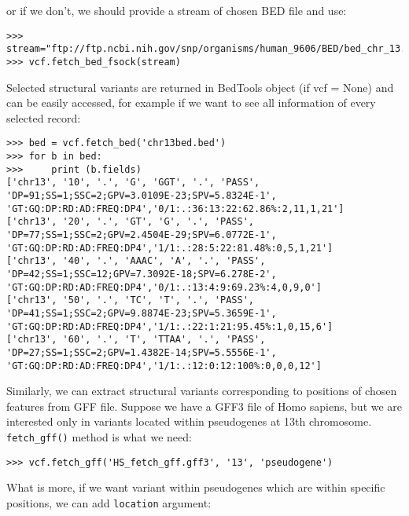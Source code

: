 \noindent or if we don't, we should provide a stream of chosen BED file and use:


\begin{verbatim}
>>> stream="ftp://ftp.ncbi.nih.gov/snp/organisms/human_9606/BED/bed_chr_13.bed.gz"
>>> vcf.fetch_bed_fsock(stream)

\end{verbatim}


\noindent Selected structural variants are returned in BedTools object (if vcf = None) and can be easily accessed, for example
if we want to see all information of every selected record:


\begin{verbatim}
>>> bed = vcf.fetch_bed('chr13bed.bed')
>>> for b in bed:
>>>     print (b.fields)
['chr13', '10', '.', 'G', 'GGT', '.', 'PASS', 'DP=91;SS=1;SSC=2;GPV=3.0109E-23;SPV=5.8324E-1',
'GT:GQ:DP:RD:AD:FREQ:DP4','0/1:.:36:13:22:62.86%:2,11,1,21']
['chr13', '20', '.', 'GT', 'G', '.', 'PASS', 'DP=77;SS=1;SSC=2;GPV=2.4504E-29;SPV=6.0772E-1',
'GT:GQ:DP:RD:AD:FREQ:DP4','1/1:.:28:5:22:81.48%:0,5,1,21']
['chr13', '40', '.', 'AAAC', 'A', '.', 'PASS', 'DP=42;SS=1;SSC=12;GPV=7.3092E-18;SPV=6.278E-2',
'GT:GQ:DP:RD:AD:FREQ:DP4','0/1:.:13:4:9:69.23%:4,0,9,0']
['chr13', '50', '.', 'TC', 'T', '.', 'PASS', 'DP=41;SS=1;SSC=2;GPV=9.8874E-23;SPV=5.3659E-1',
'GT:GQ:DP:RD:AD:FREQ:DP4','1/1:.:22:1:21:95.45%:1,0,15,6']
['chr13', '60', '.', 'T', 'TTAA', '.', 'PASS', 'DP=27;SS=1;SSC=2;GPV=1.4382E-14;SPV=5.5556E-1',
'GT:GQ:DP:RD:AD:FREQ:DP4','1/1:.:12:0:12:100%:0,0,0,12']
\end{verbatim}


\noindent Similarly, we can extract structural variants corresponding to positions of chosen features from GFF file. Suppose
we have a GFF3 file of Homo sapiens, but we are interested only in variants located within pseudogenes
at 13th chromosome. \verb|fetch_gff()| method is what we need:


\begin{verbatim}
>>> vcf.fetch_gff('HS_fetch_gff.gff3', '13', 'pseudogene')
\end{verbatim}


\noindent What is more, if we want variant within pseudogenes which are within specific positions, we can add
\verb|location| argument:


